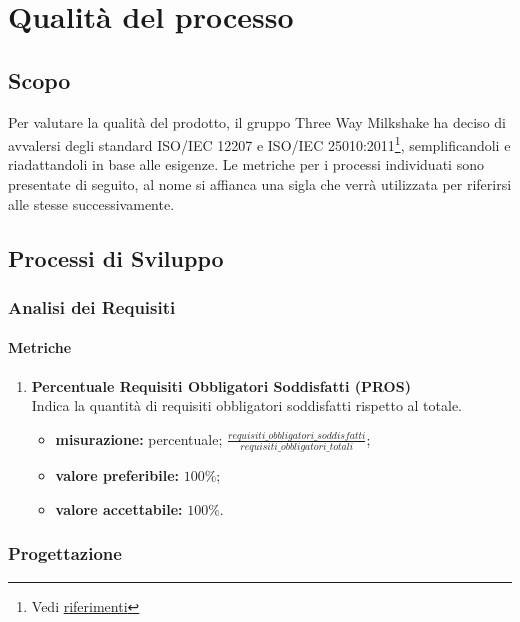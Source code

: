 \section{Qualità del processo}

\subsection{Scopo}
    Per valutare  la qualità del prodotto, il gruppo Three Way Milkshake ha deciso di avvalersi degli standard ISO/IEC 12207 e ISO/IEC 25010:2011\footnote{Vedi \hyperref[ref]{riferimenti}}, semplificandoli e riadattandoli in base alle esigenze. Le metriche per i processi individuati sono presentate di seguito, al nome si affianca una sigla che verrà utilizzata per riferirsi alle stesse successivamente.

\subsection{Processi di Sviluppo}

	\subsubsection{Analisi dei Requisiti}
		\paragraph{Metriche}
		\begin{enumerate}
		\item []
			 \textbf{Percentuale Requisiti Obbligatori Soddisfatti (PROS)}\\
			Indica la quantità di requisiti obbligatori soddisfatti rispetto al totale.
			\begin{itemize}
				\item \textbf{misurazione:} percentuale; $\frac{requisiti\_obbligatori\_soddisfatti}{requisiti\_obbligatori\_totali}$;
				\item \textbf{valore preferibile:} $100\%$;
				\item \textbf{valore accettabile:} $100\%$.
			\end{itemize}
		\end{enumerate}
	\subsubsection{Progettazione}
